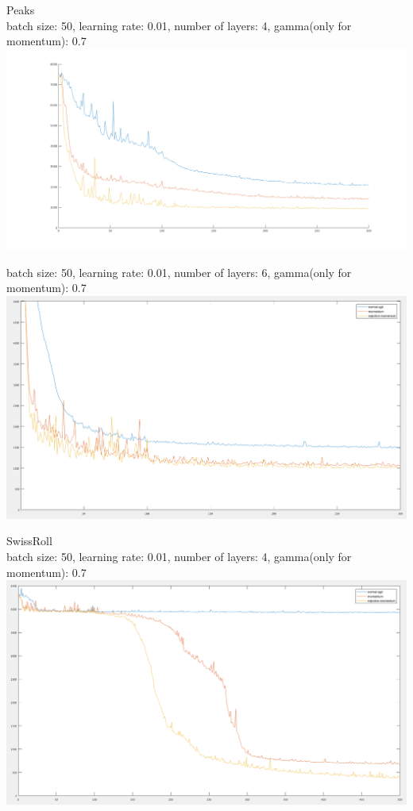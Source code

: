 \documentclass{article}
\numberwithin{equation}{section}
\begin{document}
\newpage
Peaks\\
batch size: 50, learning rate: 0.01, number of layers: 4, gamma(only for momentum): 0.7\\
\includegraphics[width=\textwidth]{rej_m_peaks_4layers.png}

batch size: 50, learning rate: 0.01, number of layers: 6, gamma(only for momentum): 0.7\\
\includegraphics[width=\textwidth]{rej_m_peaks_6layers.png}

\newpage
SwissRoll\\
batch size: 50, learning rate: 0.01, number of layers: 4, gamma(only for momentum): 0.7\\
\includegraphics[width=\textwidth]{rej_m_swissroll_4layers.png}
\end{document}
